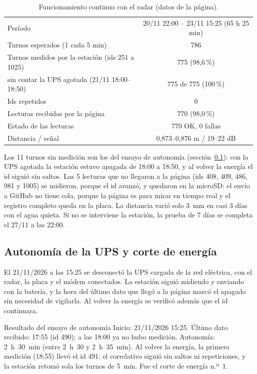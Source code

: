 \documentclass[11pt,a4paper]{article}
\begin{document}
\begin{table}[H]
    \centering
    \small
    \caption{Funcionamiento continuo con el radar (datos de la página).}
    \begin{tabular}{lc}
        \toprule
        Período & 20/11 22:00 -- 23/11 15:25 (65 h 25 min) \\
        Turnos esperados (1 cada 5 min) & 786 \\
        Turnos medidos por la estación (ids 251 a 1025) & 775 (98,6\,\%) \\
        \quad sin contar la UPS agotada (21/11 18:00--18:50) & 775 de 775 (100\,\%) \\
        Ids repetidos & 0 \\
        Lecturas recibidas por la página & 770 (98,0\,\%) \\
        Estado de las lecturas & 770 OK, 0 fallas \\
        Distancia / señal & 0,873--0,876 m / 19--22 dB \\
        \bottomrule
    \end{tabular}
\end{table}

Los 11 turnos sin medición son los del ensayo de autonomía
(sección~\ref{sec:autonomia}): con la UPS agotada la estación estuvo apagada de
18:00 a 18:50, y al volver la energía el id siguió sin saltos. Las 5 lecturas
que no llegaron a la página (ids 408, 409, 486, 981 y 1005) se midieron, porque
el id avanzó, y quedaron en la microSD: el envío a GitHub no tiene cola, porque
la página es para mirar en tiempo real y el registro completo queda en la placa.
La distancia varió solo 3~mm en casi 3 días con el agua quieta. Si no se
interviene la estación, la prueba de 7 días se completa el 27/11 a las 22:00.

\subsection{Autonomía de la UPS y corte de energía}
\label{sec:autonomia}

El 21/11/2026 a las 15:25 se desconectó la UPS cargada de la red eléctrica,
con el radar, la placa y el módem conectados. La estación siguió midiendo y
enviando con la batería, y la hora del último dato que llegó a la página marcó
el apagado sin necesidad de vigilarla. Al volver la energía se verificó además
que el id continuara.

\begin{resultado}{Resultado del ensayo de autonomía}
Inicio: 21/11/2026 15:25. Último dato recibido: 17:55 (id 490); a las 18:00 ya
no hubo medición. Autonomía: 2~h~30~min (entre 2~h~30 y
2~h~35~min). Al volver la energía, la primera medición (18:55) llevó el
id 491: el correlativo siguió sin saltos ni repeticiones, y la estación
retomó sola los turnos de 5~min. Fue el corte de energía n.º~1.
\end{resultado}
\end{document}

